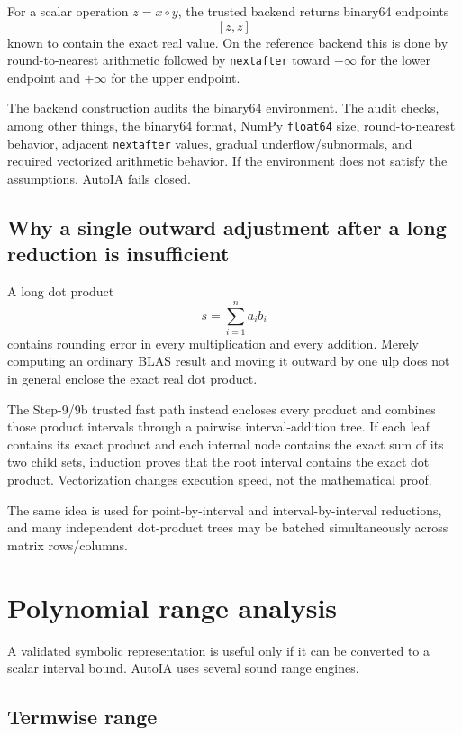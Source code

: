 \documentclass[11pt]{article}
\begin{document}
For a scalar operation \(z=x\circ y\), the trusted backend returns binary64
endpoints
\[
  [\underline z,\overline z]
\]
known to contain the exact real value.  On the reference backend this is done by
round-to-nearest arithmetic followed by \texttt{nextafter} toward
\(-\infty\) for the lower endpoint and \(+\infty\) for the upper endpoint.

The backend construction audits the binary64 environment.  The audit checks,
among other things, the binary64 format, NumPy \texttt{float64} size,
round-to-nearest behavior, adjacent \texttt{nextafter} values, gradual
underflow/subnormals, and required vectorized arithmetic behavior.  If the
environment does not satisfy the assumptions, AutoIA fails closed.

\subsection{Why a single outward adjustment after a long reduction is insufficient}

A long dot product
\[
  s=\sum_{i=1}^n a_i b_i
\]
contains rounding error in every multiplication and every addition.  Merely
computing an ordinary BLAS result and moving it outward by one ulp does not in
general enclose the exact real dot product.

The Step-9/9b trusted fast path instead encloses every product and combines those
product intervals through a pairwise interval-addition tree.  If each leaf
contains its exact product and each internal node contains the exact sum of its
two child sets, induction proves that the root interval contains the exact dot
product.  Vectorization changes execution speed, not the mathematical proof.

The same idea is used for point-by-interval and interval-by-interval reductions,
and many independent dot-product trees may be batched simultaneously across
matrix rows/columns.

\section{Polynomial range analysis}

A validated symbolic representation is useful only if it can be converted to a
scalar interval bound.  AutoIA uses several sound range engines.

\subsection{Termwise range}
\end{document}
